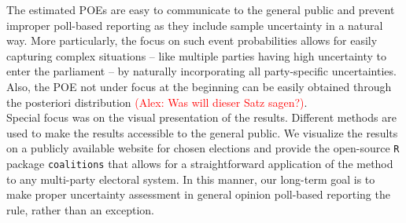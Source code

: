 \documentclass[smallcondensed]{svjour3}     %
\begin{document}
The estimated POEs are easy to communicate to the general public and prevent
improper poll-based reporting as they include sample uncertainty in a natural way.
More particularly, the focus on such event probabilities allows for easily
capturing complex situations --
like multiple parties having high uncertainty to enter the parliament --
by naturally incorporating all party-specific uncertainties.
Also, the POE not under focus at the beginning
can be easily obtained through the posteriori distribution \textcolor{red}{(Alex: Was will dieser Satz sagen?)}. \\

Special focus was on the visual presentation of the results. Different methods are used to make the results accessible to the general public.
We visualize the results on a publicly available website for chosen elections and provide the open-source \texttt{R} package \texttt{coalitions} that allows for a straightforward application of the method to any multi-party electoral system. In this manner, our long-term goal is to make proper uncertainty assessment in general opinion poll-based reporting the rule, rather than an exception.
\end{document}
